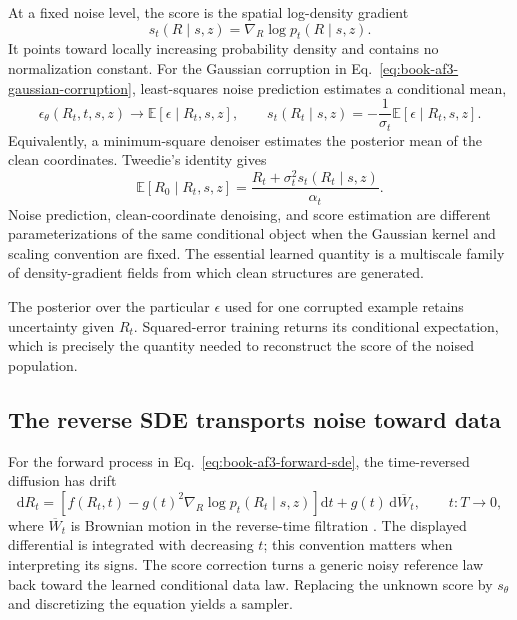 At a fixed noise level, the score is the spatial log-density gradient
\begin{equation}
s_t(R\mid s,z)=\nabla_R\log p_t(R\mid s,z).
\label{eq:book-af3-conditional-score}
\end{equation}
It points toward locally increasing probability density and contains no normalization constant.
For the Gaussian corruption in Eq.~\ref{eq:book-af3-gaussian-corruption}, least-squares noise
prediction estimates a conditional mean,
\begin{equation}
\epsilon_\theta(R_t,t,s,z)
\longrightarrow
\mathbb E[\epsilon\mid R_t,s,z],
\qquad
s_t(R_t\mid s,z)
=-\frac{1}{\sigma_t}\mathbb E[\epsilon\mid R_t,s,z].
\label{eq:book-af3-noise-score}
\end{equation}
Equivalently, a minimum-square denoiser estimates the posterior mean of the clean coordinates.
Tweedie's identity gives
\begin{equation}
\mathbb E[R_0\mid R_t,s,z]
=\frac{R_t+\sigma_t^2s_t(R_t\mid s,z)}{\alpha_t}.
\label{eq:book-af3-tweedie}
\end{equation}
Noise prediction, clean-coordinate denoising, and score estimation are different parameterizations
of the same conditional object when the Gaussian kernel and scaling convention are fixed.  The
essential learned quantity is a multiscale family of density-gradient fields from which clean
structures are generated.

The posterior over the particular $\epsilon$ used for one corrupted example retains uncertainty
given $R_t$.  Squared-error training returns its conditional expectation, which is precisely the
quantity needed to reconstruct the score of the noised population.

\subsection{The reverse SDE transports noise toward data}

For the forward process in Eq.~\ref{eq:book-af3-forward-sde}, the time-reversed diffusion has drift
\begin{equation}
\mathrm dR_t=
\left[f(R_t,t)-g(t)^2\nabla_R\log p_t(R_t\mid s,z)\right]\mathrm dt
+g(t)\,\mathrm d\overline W_t,
\qquad t:T\longrightarrow0,
\label{eq:book-af3-reverse-sde}
\end{equation}
where $\overline W_t$ is Brownian motion in the reverse-time filtration
\cite{anderson1982,song2021}.  The displayed differential is integrated with decreasing $t$; this
convention matters when interpreting its signs.  The score correction turns a generic noisy
reference law back toward the learned conditional data law.  Replacing the unknown score by
$s_\theta$ and discretizing the equation yields a sampler.

